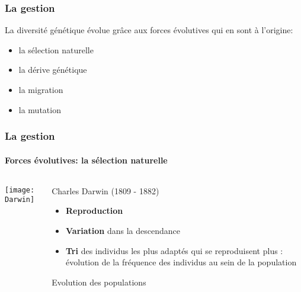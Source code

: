 \begin{frame}
\frametitle{La gestion \insitu}


La diversité génétique évolue grâce aux forces évolutives qui en sont à l'origine:

\begin{itemize}
\item la sélection naturelle
\item la dérive génétique
\item la migration
\item la mutation
\end{itemize}

\end{frame}


\begin{frame}
\frametitle{La gestion \insitu}
\framesubtitle{Forces évolutives: la sélection naturelle}

\begin{columns}

\begin{column}{.5\textwidth}
\centering
\texttt{[image: Darwin]}
\end{column}


\begin{column}{.5\textwidth}

Charles Darwin (1809 - 1882)

\begin{itemize}
\item \textbf{Reproduction} 
\item \textbf{Variation} dans la descendance
\item \textbf{Tri} des individus les plus adaptés qui se reproduisent plus : évolution de la fréquence des individus au sein de la population
\end{itemize}

\begin{block}{}
\centering
Evolution des populations
\end{block}

\end{column}

\end{columns}

\end{frame}


